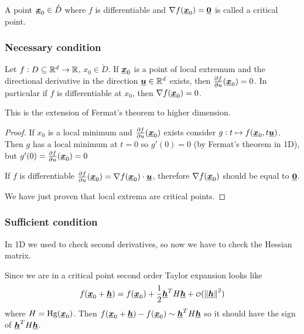 \documentclass[12pt]{extarticle}
\renewcommand{\vec}[1]{\uvec{#1}}
\newcommand{\Hg}{{\operatorfont Hg}}
\begin{document}
\begin{definition}
    A point $\vec x_0 \in \mathring{D}$ where $f$ is differentiable and $\nabla f(\vec x_0)= \vec 0$ is called a critical point.
\end{definition}

\subsubsection{Necessary condition}

\begin{proposition}
    Let $f: D\subseteq \mathbb{R}^d \to \mathbb{R}$, $x_0 \in \mathring{D}$.
    If $\vec x_0$ is a point of local extremum and the directional derivative in the direction $\vec u \in \R^d$ exists, then $\pdv{f}{u}\/(\vec x_0) = 0$.
    In particular if $f$ is differentiable at $x_0$, then $\nabla f(\vec x_0) = 0$.
\end{proposition}

\begin{remark}
    This is the extension of Fermat's theorem to higher dimension.
\end{remark}

\begin{proof}
    If $x_0$ is a local minimum and $\pdv{f}{u}\/(\vec x_0)$ exists consider $g: t \mapsto f(\vec x_0, t \vec u)$.
    Then $g$ has a local minimum at $t = 0$ so $g'(0) = 0$ (by Fermat's theorem in 1D),
    but $g'(0) = \pdv{f}{u}\/(\vec x_0) = 0$

    If $f$ is differentiable $\pdv{f}{u}\/(\vec x_0) = \nabla f (\vec x_0) \cdot \vec u$, therefore $\nabla f(\vec x_0)$ should be equal to $\vec 0$.

    We have just proven that local extrema are critical points.
\end{proof}

\subsubsection{Sufficient condition}

In 1D we used to check second derivatives, so now we have to check the Hessian matrix.

Since we are in a critical point second order Taylor expansion looks like
\begin{equation}
    f(\vec x_0 + \vec h) = f(\vec x_0) + \frac{1}{2} \vec h^T H \vec h + \o(\norm{\vec h}^2)
\end{equation}
where $H = \Hg(\vec x_0)$.
Then $f(\vec x_0 + \vec h) - f(\vec x_0) \sim \vec h^T H \vec h$ so it should have the sign of $\vec h^T H \vec h$.
\end{document}
